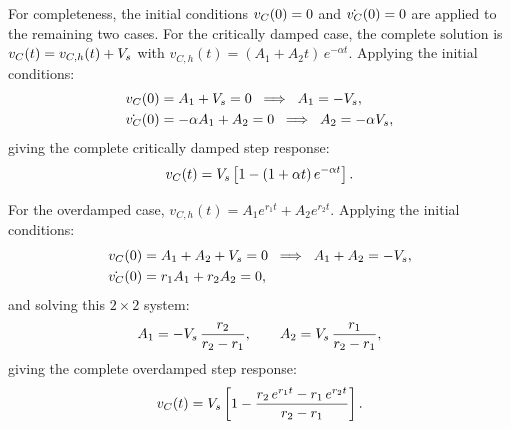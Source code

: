 For completeness, the initial conditions $v_C(0) = 0$ and $\dot{v_C}(0) = 0$
are applied to the remaining two cases.
For the critically damped case, the complete solution is
$v_C(t) = v_{C,h}(t) + V_s$ with
$v_{C,h}(t) = (A_1 + A_2 t)\,e^{-\alpha t}$.
Applying the initial conditions:
\begin{align}
  v_C(0) &= A_1 + V_s = 0 \;\implies\; A_1 = -V_s, \label{eq:crit_ic1}\\
  \dot{v_C}(0) &= -\alpha A_1 + A_2 = 0 \;\implies\;
                 A_2 = -\alpha V_s, \label{eq:crit_ic2}
\end{align}
giving the complete critically damped step response:
\begin{equation}
  v_C(t) = V_s\left[1 - (1 + \alpha t)\,e^{-\alpha t}\right].
  \label{eq:crit_final}
\end{equation}

For the overdamped case,
$v_{C,h}(t) = A_1 e^{r_1 t} + A_2 e^{r_2 t}$.
Applying the initial conditions:
\begin{align}
  v_C(0) &= A_1 + A_2 + V_s = 0 \;\implies\; A_1 + A_2 = -V_s,
    \label{eq:over_ic1}\\
  \dot{v_C}(0) &= r_1 A_1 + r_2 A_2 = 0,
    \label{eq:over_ic2}
\end{align}
and solving this $2\times2$ system:
\begin{equation}
  A_1 = -V_s\,\frac{r_2}{r_2 - r_1}, \qquad
  A_2 = V_s\,\frac{r_1}{r_2 - r_1},
  \label{eq:over_coeffs}
\end{equation}
giving the complete overdamped step response:
\begin{equation}
  v_C(t) = V_s\left[1 -
    \frac{r_2\,e^{r_1 t} - r_1\,e^{r_2 t}}{r_2 - r_1}\right].
  \label{eq:over_final}
\end{equation}
